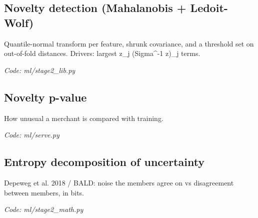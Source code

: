 \documentclass[11pt,a4paper]{article}
\newcommand{\where}[1]{\par{\small\itshape\color{mute}Code: #1}\par}
\begin{document}
\subsection*{Novelty detection (Mahalanobis + Ledoit-Wolf)}
\par\smallskip\noindent{}\par\smallskip
\par\smallskip\noindent{}\par\smallskip
Quantile-normal transform per feature, shrunk covariance, and a threshold set on out-of-fold distances. Drivers: largest z\_j (Sigma\textasciicircum{}-1 z)\_j terms.
\where{ml/stage2\_lib.py}

\subsection*{Novelty p-value}
\par\smallskip\noindent{}\par\smallskip
How unusual a merchant is compared with training.
\where{ml/serve.py}

\subsection*{Entropy decomposition of uncertainty}
\par\smallskip\noindent{}\par\smallskip
\par\smallskip\noindent{}\par\smallskip
\par\smallskip\noindent{}\par\smallskip
Depeweg et al. 2018 / BALD: noise the members agree on vs disagreement between members, in bits.
\where{ml/stage2\_math.py}
\end{document}
